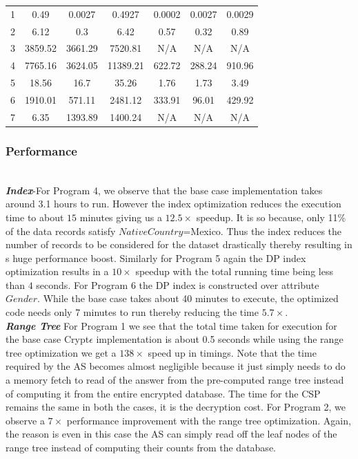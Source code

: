 \begin{table}[ht]
\begin{tabular}{c c c c c c c}
\midrule
1 & 0.49& 0.0027& 0.4927 & 0.0002 &0.0027 & 0.0029 \\
2 &  6.12 & 0.3  &6.42 &0.57&0.32& 0.89\\ %
3&  3859.52 & 3661.29 & 7520.81&N/A&N/A &N/A \\4  &7765.16&3624.05&11389.21&622.72&288.24& 910.96\\5&18.56&16.7&35.26&1.76&1.73&3.49\\6&1910.01&571.11&2481.12&333.91&96.01&429.92\\7&6.35 & 1393.89 & 1400.24 &  N/A & N/A & N/A\\ [1ex]
\bottomrule
\end{tabular}
\label{c}
\end{table}
\subsubsection{Performance}
\textit{\textbf{\\Index}}-For Program 4, we observe that the base case implementation takes around 3.1 hours to run. However the  index optimization reduces the execution time to about $15$ minutes  giving us a $12.5\times $ speedup. It is so because, only 11\% of the data records satisfy $NativeCountry$=Mexico. Thus the index reduces the number of records to be considered for the dataset drastically thereby resulting in s huge performance boost. Similarly for Program 5 again the DP index optimization results in a $10\times$ speedup with the total running time being less than $4$ seconds. For Program 6 the DP index is constructed over attribute $Gender$. While the base case takes about 40 minutes to execute, the optimized code needs only 7 minutes to run thereby reducing the time  $5.7\times$.\\\textit{\textbf{Range Tree}}
 For Program 1 we see that the total time taken for execution for the base case Crypt$\epsilon$ implementation is about 0.5 seconds while using the range tree optimization we get a $138\times$ speed up in timings. Note that the time required by the \textsf{AS} becomes almost negligible because it just simply needs to do a memory fetch to read of the answer from the pre-computed range tree instead of computing it from the entire encrypted database. The time for the \textsf{CSP} remains the same in both the cases, it is the decryption cost. For Program 2, we observe a $7\times$ performance improvement with the range tree optimization. Again, the reason is even in this case the \textsf{AS} can simply read off the leaf nodes of the range tree instead of computing their counts from the database. 
